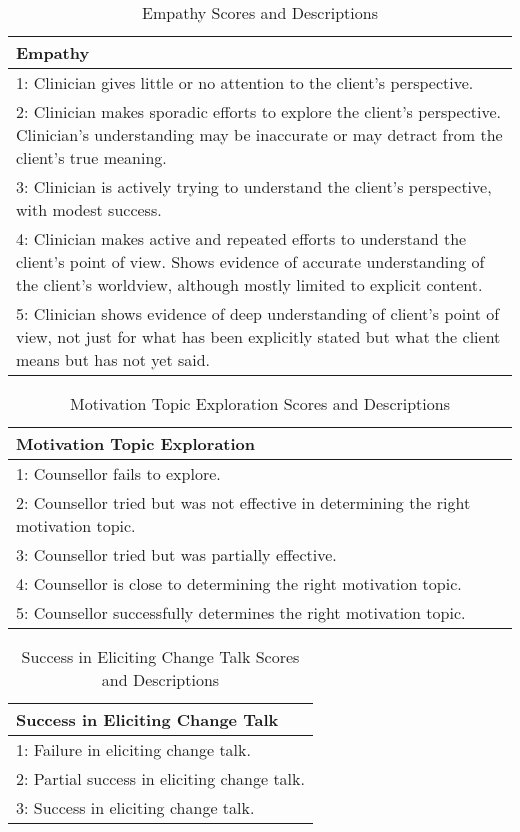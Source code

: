 \begin{table*}[tb]
\begin{tabularx}{\textwidth}{X}
\toprule
\textbf{Empathy} \\ \midrule
1: Clinician gives little or no attention to the client’s perspective.                  \\
2: Clinician makes sporadic efforts to explore the client’s perspective. Clinician’s understanding may be inaccurate or may detract from the client’s true meaning.      \\
3: Clinician is actively trying to understand the client’s perspective, with modest success. \\
4: Clinician makes active and repeated efforts to understand the client’s point of view. Shows evidence of accurate understanding of the client’s worldview, although mostly limited to explicit content. \\
5: Clinician shows evidence of deep understanding of client’s point of view, not just for what has been explicitly stated but what the client means but has not yet said. \\
\bottomrule                            
\end{tabularx}
\caption{Empathy Scores and Descriptions}
\label{tab:empathy score}
\end{table*}

\begin{table*}[tb]
\begin{tabularx}{\textwidth}{X}
\toprule
\textbf{Motivation Topic Exploration} \\ \midrule
1: Counsellor fails to explore.                  \\
2: Counsellor tried but was not effective in determining the right motivation topic.      \\
3: Counsellor tried but was partially effective. \\
4: Counsellor is close to determining the right motivation topic. \\
5: Counsellor successfully determines the right motivation topic. \\
\bottomrule                            
\end{tabularx}
\caption{Motivation Topic Exploration Scores and Descriptions}
\label{tab:change talk exploration score}
\end{table*}

\begin{table*}[tb]
\begin{tabularx}{\textwidth}{X}
\toprule
\textbf{Success in Eliciting Change Talk} \\ \midrule
1: Failure in eliciting change talk.                  \\
2: Partial success in eliciting change talk.      \\
3: Success in eliciting change talk. \\
\bottomrule                            
\end{tabularx}
\caption{Success in Eliciting Change Talk Scores and Descriptions}
\label{tab:success in eliciting change talk score}
\end{table*}

